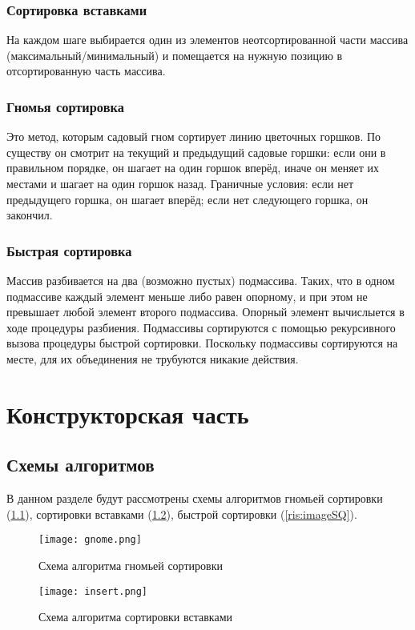 \documentclass[12pt]{report}
\begin{document}
	\subsection{Сортировка вставками}
	На каждом шаге выбирается один из элементов неотсортированной части массива (максимальный/минимальный) 
	и помещается на нужную позицию в отсортированную часть массива.
	
	\subsection{Гномья сортировка}
	Это метод, которым садовый гном сортирует линию цветочных горшков. По существу он смотрит на текущий и предыдущий садовые горшки: если они в правильном порядке, он шагает на один горшок вперёд, иначе он меняет их местами и шагает на один горшок назад. Граничные условия: если нет предыдущего горшка, он шагает вперёд; если нет следующего горшка, он закончил.
	
	\subsection {Быстрая сортировка}
	Массив разбивается на два (возможно пустых) подмассива. Таких, что в одном подмассиве каждый элемент меньше либо равен опорному, 
	и при этом не превышает любой элемент второго подмассива. Опорный элемент вычислыется в ходе процедуры разбиения. 
	Подмассивы сортируются с помощью рекурсивного вызова процедуры быстрой сортировки. 
	Поскольку подмассивы сортируются на месте, для их объединения не трубуются никакие действия.
	
	
	\chapter{Конструкторская часть}
	\section{Схемы алгоритмов}
	В данном разделе будут рассмотрены схемы алгоритмов гномьей сортировки (\ref{ris:imageSB}), сортировки вставками (\ref{ris:imageSI}), быстрой сортировки (\ref{ris:imageSQ}).
	
	\newpage
	\begin{figure}[h]
		\texttt{[image: gnome.png]}
		\caption{Схема алгоритма гномьей сортировки}
		\label{ris:imageSB}
	\end{figure}
	
	\newpage
	\begin{figure}[h]
		\texttt{[image: insert.png]}
		\caption{Схема алгоритма сортировки вставками}
		\label{ris:imageSI}
	\end{figure}
	
\end{document}
